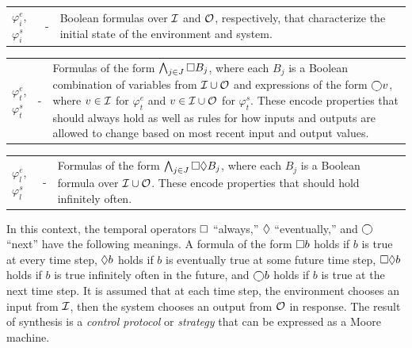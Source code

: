 \documentclass[runningheads]{llncs}
\begin{document}
\vspace{0.5em}

\noindent \begin{xtabular}{p{.045\columnwidth}p{.015\columnwidth}p{.860\columnwidth}}
 $\varphi^e_i$, $\varphi^s_i$ & - & Boolean formulas over $\mathcal{I}$ and $\mathcal{O}$, respectively, that characterize the initial state of the environment and system.
\end{xtabular}

\noindent \begin{xtabular}{p{.045\columnwidth}p{.015\columnwidth}p{.860\columnwidth}}
 $\varphi^e_t$, $\varphi^s_t$ & - &  Formulas of the form $\bigwedge_{j \in J} \square B_j$, where each $B_j$ is a Boolean combination of variables from $\mathcal{I} \cup \mathcal{O}$ and expressions of the form $\varbigcirc v$, where $v \in \mathcal{I}$ for $\varphi^e_t$ and $v \in \mathcal{I} \cup \mathcal{O}$ for $\varphi^s_t$. These encode properties that should always hold as well as rules for how inputs and outputs are allowed to change based on most recent input and output values.
\end{xtabular}

\noindent \begin{xtabular}{p{.045\columnwidth}p{.015\columnwidth}p{.860\columnwidth}}
$\varphi^e_l$, $\varphi^s_l$ & - & Formulas of the form $\bigwedge_{j \in J} \square \lozenge B_j$, where each $B_j$ is a Boolean formula over $\mathcal{I} \cup \mathcal{O}$. These encode properties that should hold infinitely often.
\end{xtabular}

\vspace{0.5em}

\noindent 
In this context, the temporal operators $\square$ ``always,'' $\lozenge$ ``eventually,'' and $\varbigcirc$  ``next'' have the following meanings. 
A formula of the form $\square b$ holds if $b$ is true at every time step, 
$\lozenge b$ holds if $b$ is eventually true at some future time step, 
$\square \lozenge b$ holds if $b$ is true infinitely often in the future, 
and $\varbigcirc b$ holds if $b$ is true at the next time step. 
It is assumed that at each time step, the environment chooses an input from $\mathcal{I}$, then the system chooses an output from $\mathcal{O}$ in response. 
The result of synthesis is a \emph{control protocol} or \emph{strategy} that can be expressed as a Moore machine. 
\end{document}

